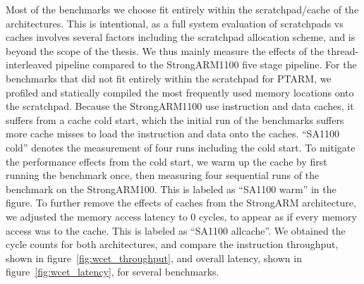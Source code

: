 Most of the benchmarks we choose fit entirely within the scratchpad/cache of the architectures.
This is intentional, as a full system evaluation of scratchpads vs caches involves several factors including the scratchpad allocation scheme, and is beyond the scope of the thesis.
We thus mainly measure the effects of the thread-interleaved pipeline compared to the StrongARM1100 five stage pipeline. 
For the benchmarks that did not fit entirely within the scratchpad for PTARM, we profiled and statically compiled the most frequently used memory locations onto the scratchpad.
Because the StrongARM1100 use instruction and data caches, it suffers from a cache cold start, which the initial run of the benchmarks suffers more cache misses to load the instruction and data onto the caches. 
``SA1100 cold'' denotes the measurement of four runs including the cold start.  
To mitigate the performance effects from the cold start, we warm up the cache by first running the benchmark once, then measuring four sequential runs of the benchmark on the StrongARM100.  
This is labeled as ``SA1100 warm'' in the figure. 
To further remove the effects of caches from the StrongARM architecture, we adjusted the memory access latency to 0 cycles, to appear as if every memory access was to the cache. 
This is labeled as ``SA1100 allcache''.
We obtained the cycle counts for both architectures, and compare the instruction throughput, shown in figure~\ref{fig:wcet_throughput}, and overall latency, shown in figure~\ref{fig:wcet_latency}, for several benchmarks.

